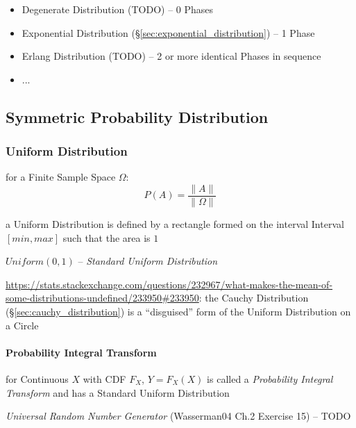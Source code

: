 \begin{itemize}
  \item Degenerate Distribution (TODO) -- 0
    Phases
  \item Exponential Distribution (\S\ref{sec:exponential_distribution}) -- 1
    Phase
  \item Erlang Distribution (TODO) -- 2 or more identical Phases in sequence
  \item ...
\end{itemize}



\subsection{Symmetric Probability Distribution}
\label{sec:symmetric_probability}

\subsubsection{Uniform Distribution}\label{sec:uniform_distribution}

for a Finite Sample Space $\Omega$:
\[
  P(A) = \frac{\|A\|}{\|\Omega\|}
\]

a Uniform Distribution is defined by a rectangle formed on the interval Interval
$[min,max]$ such that the area is $1$

$Uniform(0,1)$ -- \emph{Standard Uniform Distribution}

\url{https://stats.stackexchange.com/questions/232967/what-makes-the-mean-of-some-distributions-undefined/233950#233950}:
the Cauchy Distribution (\S\ref{sec:cauchy_distribution}) is a ``disguised''
form of the Uniform Distribution on a Circle



\paragraph{Probability Integral Transform}
\label{sec:probability_integral_transform}\hfill

for Continuous $X$ with CDF $F_X$, $Y = F_X(X)$ is called a \emph{Probability
  Integral Transform} and has a Standard Uniform Distribution

\emph{Universal Random Number Generator} (Wasserman04 Ch.2 Exercise 15) -- TODO



